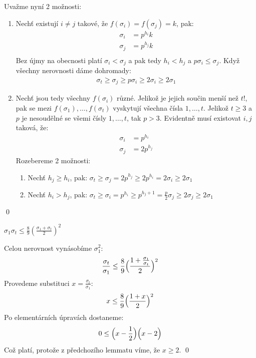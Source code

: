 Uvažme nyní 2 možnosti:
\begin{enumerate}
\item Nechť existují $i \neq j$ takové, že $f(\sigma_i) = f(\sigma_j) = k$, pak:
\begin{align*}
\sigma_i &= p^{h_i}k \\
\sigma_j &= p^{h_j}k \\
\end{align*}
Bez újmy na obecnosti platí $\sigma_i < \sigma_j$ a pak tedy $h_i < h_j$ a $p\sigma_i \leq \sigma_j$. Když všechny nerovnosti dáme dohromady:
\begin{align*}
\sigma_t \geq \sigma_j \geq p\sigma_i \geq 2\sigma_i \geq 2\sigma_1
\end{align*}
\item Nechť jsou tedy všechny $f(\sigma_i)$ různé. Jelikož je jejich součin menší než $t!$, pak se mezi $f(\sigma_1),\dots ,f(\sigma_t)$ vyskytují všechna čísla $1,\dots,t$. Jelikož $t \geq 3$ a $p$ je nesoudělné se všemi čísly $1,\dots,t$, tak $p > 3$. Evidentně musí existovat $i,j$ taková, že:
\begin{align*}
\sigma_i &= p^{h_i} \\
\sigma_j &= 2p^{h_j}
\end{align*}
Rozebereme 2 možnosti:
\begin{enumerate}
\item Nechť $h_j \geq h_i$, pak: $\sigma_t \geq \sigma_j = 2p^{h_j} \geq 2p^{h_i} = 2\sigma_i \geq 2\sigma_1$
\item Nechť $h_i > h_j$, pak: $\sigma_t \geq \sigma_i = p^{h_i} \geq p^{h_j + 1} = \frac{p}{2}\sigma_j \geq 2\sigma_j \geq 2\sigma_1$
\end{enumerate}
\end{enumerate}
\qed

\lm $\sigma_1\sigma_t \leq \frac{8}{9}(\frac{\sigma_1 + \sigma_t}{2})^2$

\dk Celou nerovnost vynásobíme $\sigma^2_1$:
\begin{align*}
\frac{\sigma_t}{\sigma_1} \leq \frac{8}{9}\Bigl(\frac{1 + \frac{\sigma_1}{\sigma_t}}{2}\Bigr)^2
\end{align*}
Provedeme substituci $x = \frac{\sigma_t}{\sigma_1}$:
\begin{align*}
x \leq \frac{8}{9}\Bigl(\frac{1 + x}{2}\Bigr)^2
\end{align*}
Po elementárních úpravách dostaneme:
\begin{align*}
0 \leq \Bigl(x - \frac{1}{2}\Bigr)\Bigl(x - 2\Bigr)
\end{align*}
Což platí, protože z předchozího lemmatu víme, že $x \geq 2$. \qed


